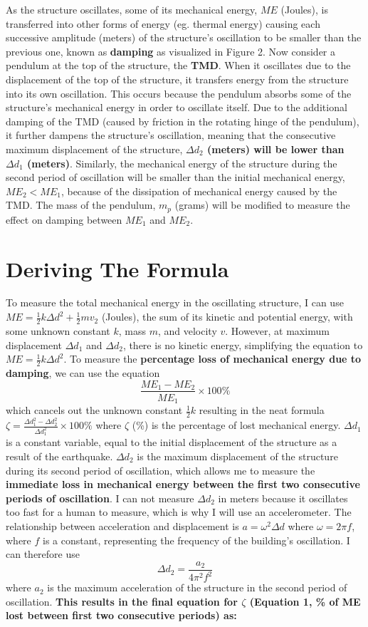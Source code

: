 \documentclass[11pt]{article}
\begin{document}
As the structure oscillates, some of its mechanical energy, $ME$ (Joules), is transferred into other forms of energy (eg. thermal energy) causing each successive amplitude (meters) of the structure’s oscillation to be smaller than the previous one, known as\textbf{ damping }as visualized in Figure 2. Now consider a pendulum at the top of the structure, the \textbf{TMD}. When it oscillates due to the displacement of the top of the structure, it transfers energy from the structure into its own oscillation. This occurs because the pendulum absorbs some of the structure's mechanical energy in order to oscillate itself. Due to the additional damping of the TMD (caused by friction in the rotating hinge of the pendulum), it further dampens the structure’s oscillation, meaning that the consecutive maximum displacement of the structure, \textbf{$\Delta d_2$ (meters) will be lower than $\Delta d_1$ (meters)}. Similarly, the mechanical energy of the structure during the second period of oscillation will be smaller than the initial mechanical energy, $ME_2 < ME_1$, because of the dissipation of mechanical energy caused by the TMD. The mass of the pendulum, $m_p$ (grams) will be modified to measure the effect on damping between $ME_1$ and $ME_2$.

\section{Deriving The Formula}

To measure the total mechanical energy in the oscillating structure, I can use $ME=\frac{1}{2}k\Delta d ^2+\frac{1}{2}mv_2$ (Joules), the sum of its kinetic and potential energy, with some unknown constant $k$, mass $m$, and velocity $v$. However, at maximum displacement $\Delta d_1$ and $\Delta d_2$, there is no kinetic energy, simplifying the equation to $ME=\frac{1}{2}k \Delta d^2$. To measure the \textbf{percentage loss of mechanical energy due to damping}, we can use the equation $$\frac{ME_1-ME_2}{ME_1}\times100\%$$ which cancels out the unknown constant $\frac{1}{2}k$ resulting in the neat formula $\zeta=\frac{\Delta d_1^2-\Delta d_2^2}{\Delta d_1^2}\times100\%$ where $\zeta$ (\%) is the percentage of lost mechanical energy.
$\Delta d_1$ is a constant variable, equal to the initial displacement of the structure as a result of the earthquake. $\Delta d_2$ is the maximum displacement of the structure during its second period of oscillation, which allows me to measure the \textbf{immediate loss in mechanical energy between the first two consecutive periods of oscillation}. I can not measure $\Delta d_2$ in meters because it oscillates too fast for a human to measure, which is why I will use an accelerometer. The relationship between acceleration and displacement is $a=\omega ^2 \Delta d$ where $\omega=2\pi f$, where $f$ is a constant, representing the frequency of the building’s oscillation. I can therefore use $$\Delta d_2=\frac{a_2}{4\pi^2f^2}$$ where $a_2$ is the maximum acceleration of the structure in the second period of oscillation. \textbf{This results in the final equation for $\zeta$ (Equation 1, \% of ME lost between first two consecutive periods) as:} 
\end{document}
